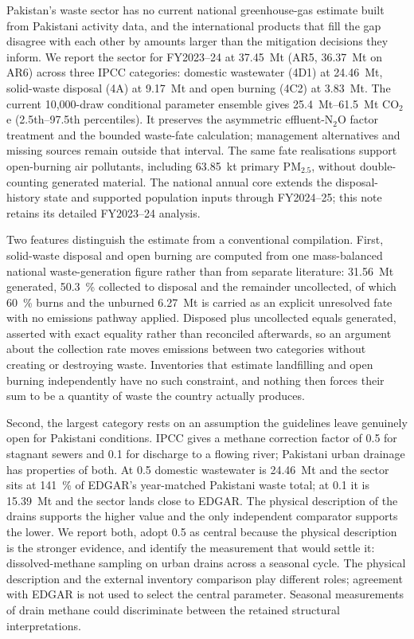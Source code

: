 Pakistan's waste sector has no current national greenhouse-gas estimate built from Pakistani
activity data, and the international products that fill the gap disagree with each other by
amounts larger than the mitigation decisions they inform. We report the sector for
FY2023--24 at
\SI{37.45}{\mega\tonne} \COe{} (AR5, \SI{36.37}{\mega\tonne} on AR6) across three IPCC
categories: domestic wastewater (4D1) at \SI{24.46}{\mega\tonne}, solid-waste disposal (4A)
at \SI{9.17}{\mega\tonne} and open burning (4C2) at \SI{3.83}{\mega\tonne}. The current 10,000-draw conditional parameter ensemble gives \SIrange{25.4}{61.5}{\mega\tonne} CO$_2$e (2.5th--97.5th percentiles). It preserves the asymmetric effluent-N$_2$O factor treatment and the bounded waste-fate calculation; management alternatives and missing sources remain outside that interval. The same fate realisations support open-burning air pollutants, including \SI{63.85}{\kilo\tonne} primary PM$_{2.5}$, without double-counting generated material. The national annual core extends the disposal-history state and supported population inputs through FY2024--25; this note retains its detailed FY2023--24 analysis.

Two features distinguish the estimate from a conventional compilation. First, solid-waste
disposal and open burning are computed from one mass-balanced national waste-generation
figure rather than from separate literature: \SI{31.56}{\mega\tonne}
generated, \SI{50.3}{\percent} collected to disposal and the remainder uncollected, of which
\SI{60}{\percent} burns and the unburned \SI{6.27}{\mega\tonne} is carried as an explicit
unresolved fate with no emissions pathway applied.
Disposed plus uncollected equals generated, asserted with exact
equality rather than reconciled afterwards, so an argument about the collection rate moves
emissions between two categories without creating or destroying waste. Inventories that
estimate landfilling and open burning independently have no such constraint, and nothing then
forces their sum to be a quantity of waste the country actually produces.

Second, the largest category rests on an assumption the guidelines leave genuinely open for
Pakistani conditions. IPCC gives a methane correction factor of \num{0.5} for stagnant sewers
and \num{0.1} for discharge to a flowing river; Pakistani urban drainage has properties of
both. At \num{0.5} domestic wastewater is \SI{24.46}{\mega\tonne} and the sector sits at
\SI{141}{\percent} of EDGAR's year-matched Pakistani waste total; at \num{0.1} it is
\SI{15.39}{\mega\tonne} and the sector lands close to EDGAR. The physical description of the
drains supports the higher value and the only independent comparator supports the lower. We
report both, adopt \num{0.5} as central because the physical description is the stronger
evidence, and identify the measurement that would settle it: dissolved-methane sampling on
urban drains across a seasonal cycle. The physical description and the external inventory comparison play different roles; agreement with EDGAR is not used to select the central parameter. Seasonal measurements of drain methane could discriminate between the retained structural interpretations.
